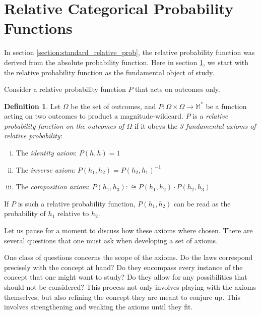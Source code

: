 \documentclass[twoside]{article}
\theoremstyle{plain}%
\theoremstyle{definition}
\newtheorem{definition}{Definition}[section]
\theoremstyle{remark}
\begin{document}
\section{Relative Categorical Probability Functions}
\label{section:new_relative_prob}

In section \ref{section:standard_relative_prob}, the relative probability function was derived from the absolute probability function. Here in section \ref{section:new_relative_prob}, we start with the relative probability function as the fundamental object of study.

Consider a relative probability function \(P\) that acts on outcomes only.

\begin{definition}
\label{def:fundamental_laws}
Let \(\Omega\) be the set of outcomes, and \(P: \Omega \times \Omega \rightarrow \mathbb{M}^*\) be a function acting on two outcomes to product a magnitude-wildcard. \(P\) is a \textit{relative probability function on the outcomes of \(\Omega\)} if it obeys the \textit{3 fundamental axioms of relative probability}:

\begin{enumerate}[(i)]
\item The \textit{identity axiom}: \(P(h, h) = 1\)
\item The \textit{inverse axiom}: \(P(h_1, h_2) = P(h_2, h_1)^{-1}\)
\item The \textit{composition axiom}: \(P(h_1, h_3) :\cong P(h_1, h_2) \cdot P(h_2, h_3)\)
\end{enumerate}

\end{definition}

If \(P\) is such a relative probability function, \(P(h_1, h_2)\) can be read as the probability of \(h_1\) relative to \(h_2\).

Let us pause for a moment to discuss how these axioms where chosen. There are several questions that one must ask when developing a set of axioms.

One class of questions concerns the scope of the axioms. Do the laws correspond precisely with the concept at hand? Do they encompass every instance of the concept that one might want to study? Do they allow for any possibilities that should not be considered? This process not only involves playing with the axioms themselves, but also refining the concept they are meant to conjure up. This involves strengthening and weaking the axioms until they fit.
\end{document}
